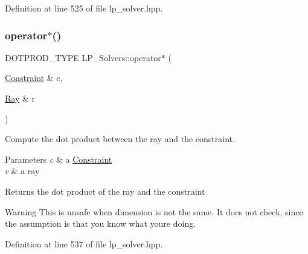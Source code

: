 Definition at line 525 of file lp\+\_\+solver.\+hpp.

\mbox{\label{group___c_l_s_solvers_gaf9f83e5d45bfc080fbffde26ebb93892}} 
\subsubsection{\texorpdfstring{operator$\ast$()}{operator*()}\hspace{0.1cm}{\footnotesize\ttfamily [6/6]}}
{\footnotesize\ttfamily D\+O\+T\+P\+R\+O\+D\+\_\+\+T\+Y\+PE L\+P\+\_\+\+Solvers\+::operator$\ast$ (\begin{DoxyParamCaption}\item[{\hyperlink{group___c_l_s_solvers_class_l_p___solvers_1_1_constraint}{Constraint} \&}]{c,  }\item[{\hyperlink{group___c_l_s_solvers_class_l_p___solvers_1_1_ray}{Ray} \&}]{r }\end{DoxyParamCaption})\hspace{0.3cm}{\ttfamily [inline]}}



Compute the dot product between the ray and the constraint. 


\begin{DoxyParams}{Parameters}
{\em c} & a \hyperlink{group___c_l_s_solvers_class_l_p___solvers_1_1_constraint}{Constraint} \\
\hline
{\em r} & a ray \\
\hline
\end{DoxyParams}
\begin{DoxyReturn}{Returns}
the dot product of the ray and the constraint 
\end{DoxyReturn}
\begin{DoxyWarning}{Warning}
This is unsafe when dimension is not the same. It does not check, since the assumption is that you know what you\textquotesingle{}re doing. 
\end{DoxyWarning}


Definition at line 537 of file lp\+\_\+solver.\+hpp.

\mbox{\label{group___c_l_s_solvers_gaf293c6d803dc697897463525aa1d1d44}} 
